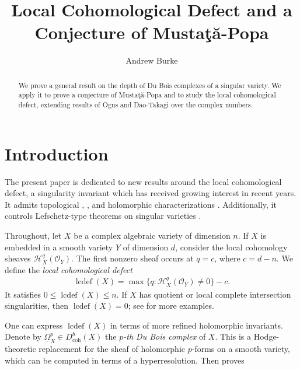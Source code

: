 \documentclass[11pt]{amsart}
\theoremstyle{definition}
\theoremstyle{plain}
\DeclareMathOperator{\lcdef}{lcdef}
\DeclareMathOperator{\coh}{coh}
\begin{document}
\title{Local Cohomological Defect and a Conjecture of Musta{\c{t}}{\u{a}}-Popa}


\author{Andrew Burke}
\address{Department of Mathematics, Harvard University, 1 Oxford Street, Cambridge, MA 02138, USA}


\begin{abstract}
We prove a general result on the depth of Du Bois complexes of a singular variety. We apply it to prove a conjecture of Musta{\c{t}}{\u{a}}-Popa and to study the local cohomological defect, extending results of Ogus and Dao-Takagi over the complex numbers.
\end{abstract}

\maketitle

\setcounter{tocdepth}{1}



\section{Introduction}

The present paper is dedicated to new results around the local cohomological defect, a singularity invariant which has received growing interest in recent years. It admits topological \cite{bbl}, \cite{ogus}, \cite{saito lcdef} and holomorphic characterizations \cite{local cohomology}. Additionally, it controls Lefschetz-type theorems on singular varieties \cite{popa park lefschetz}. 

Throughout, let $X$ be a complex algebraic variety of dimension $n$. If $X$ is embedded in a smooth variety $Y$ of dimension $d$, consider the local cohomology sheaves $\mathcal{H}^q_X(\mathscr{O}_Y)$. The first nonzero sheaf occurs at $q=c$, where $c = d-n$. We define the \emph{local cohomological defect}
\begin{align*}
    \lcdef(X) = \max \{ q : \mathcal{H}^q_X( \mathscr{O}_Y) \neq 0 \} - c.
\end{align*}
It satisfies $0 \leq \lcdef(X) \leq n$. If $X$ has quotient or local complete intersection singularities, then $\lcdef(X) = 0$; see \cite[Example $2.4$]{popa shen} for more examples.

One can express $\lcdef(X)$ in terms of more refined holomorphic invariants. Denote by $\underline{\Omega}_X^p \in D^b_{\coh}(X)$ the \emph{$p$-th Du Bois complex} \cite{du bois} of $X$. This is a Hodge-theoretic replacement for the sheaf of holomorphic $p$-forms on a smooth variety, which can be computed in terms of a hyperresolution. Then \cite[Theorem E]{local cohomology} proves
\end{document}
